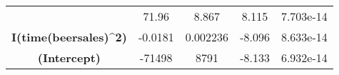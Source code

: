 \documentclass[]{book}
\theoremstyle{definition}
\theoremstyle{definition}
\theoremstyle{remark}
\begin{document}
\begin{longtable}[c]{@{}ccccc@{}}
\begin{minipage}[t]{0.37\columnwidth}
\strut\end{minipage} &
\begin{minipage}[t]{0.12\columnwidth}\centering\strut
71.96
\strut\end{minipage} &
\begin{minipage}[t]{0.14\columnwidth}\centering\strut
8.867
\strut\end{minipage} &
\begin{minipage}[t]{0.11\columnwidth}\centering\strut
8.115
\strut\end{minipage} &
\begin{minipage}[t]{0.11\columnwidth}\centering\strut
7.703e-14
\strut\end{minipage}\tabularnewline
\begin{minipage}[t]{0.37\columnwidth}\centering\strut
\textbf{I(time(beersales)\^{}2)}
\strut\end{minipage} &
\begin{minipage}[t]{0.12\columnwidth}\centering\strut
-0.0181
\strut\end{minipage} &
\begin{minipage}[t]{0.14\columnwidth}\centering\strut
0.002236
\strut\end{minipage} &
\begin{minipage}[t]{0.11\columnwidth}\centering\strut
-8.096
\strut\end{minipage} &
\begin{minipage}[t]{0.11\columnwidth}\centering\strut
8.633e-14
\strut\end{minipage}\tabularnewline
\begin{minipage}[t]{0.37\columnwidth}\centering\strut
\textbf{(Intercept)}
\strut\end{minipage} &
\begin{minipage}[t]{0.12\columnwidth}\centering\strut
-71498
\strut\end{minipage} &
\begin{minipage}[t]{0.14\columnwidth}\centering\strut
8791
\strut\end{minipage} &
\begin{minipage}[t]{0.11\columnwidth}\centering\strut
-8.133
\strut\end{minipage} &
\begin{minipage}[t]{0.11\columnwidth}\centering\strut
6.932e-14
\strut\end{minipage}\tabularnewline
\bottomrule
\end{longtable}
\end{document}

